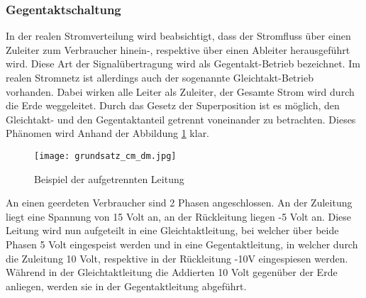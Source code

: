 \subsubsection{Gegentaktschaltung} \label{subsec:gegentakt}

In der realen Stromverteilung wird beabsichtigt, dass der Stromfluss über einen Zuleiter zum Verbraucher hinein-, respektive über einen Ableiter herausgeführt wird. 
Diese Art der Signalübertragung wird als Gegentakt-Betrieb bezeichnet. Im realen Stromnetz ist allerdings auch der sogenannte Gleichtakt-Betrieb vorhanden. Dabei wirken alle Leiter als Zuleiter, der Gesamte Strom wird durch die Erde weggeleitet. Durch das Gesetz der Superposition ist es möglich, den Gleichtakt- und den Gegentaktanteil getrennt voneinander zu betrachten. Dieses Phänomen wird Anhand der Abbildung \ref{fig:auftrennen_der_leitung} klar. 

\begin{figure}[H]
	\centering
	\texttt{[image: grundsatz\_cm\_dm.jpg]}
	\caption{Beispiel der aufgetrennten Leitung}
	\label{fig:auftrennen_der_leitung}
\end{figure} 


An einen geerdeten Verbraucher sind 2 Phasen angeschlossen. An der Zuleitung liegt eine Spannung von 15 Volt an, an der Rückleitung liegen -5 Volt an. Diese Leitung wird nun aufgeteilt in eine Gleichtaktleitung, bei welcher über beide Phasen 5 Volt eingespeist werden und in eine Gegentaktleitung, in welcher durch die Zuleitung 10 Volt, respektive in der Rückleitung -10V eingespiesen werden. Während in der Gleichtaktleitung die Addierten 10 Volt gegenüber der Erde anliegen, werden sie in der Gegentaktleitung abgeführt.

